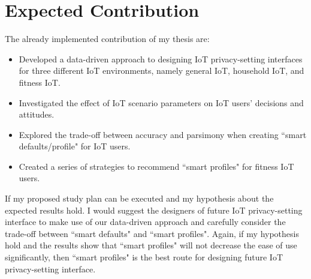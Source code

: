 \chapter{Expected Contribution}\label{chapter:conclusion}
The already implemented contribution of my thesis are:
\begin{itemize}
	\item Developed a data-driven approach to designing IoT privacy-setting interfaces for three different IoT environments, namely general IoT, household IoT, and fitness IoT.
	\item Investigated the effect of IoT scenario parameters on IoT users' decisions and attitudes.
	\item Explored the trade-off between accuracy and parsimony when creating ``smart defaults/profile" for IoT users.
	\item Created a series of strategies to recommend ``smart profiles" for fitness IoT users.
\end{itemize}

If my proposed study plan can be executed and my hypothesis about the expected results hold. I would suggest the designers of future IoT privacy-setting interface to make use of our data-driven approach and carefully consider the trade-off between ``smart defaults" and ``smart profiles". Again, if my hypothesis hold and the results show that ``smart profiles" will not decrease the ease of use significantly, then ``smart profiles" is the best route for designing future IoT privacy-setting interface.

